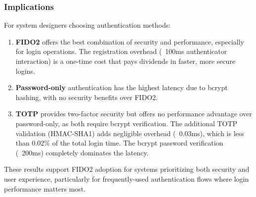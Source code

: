 \subsubsection{Implications}

For system designers choosing authentication methods:

\begin{enumerate}
    \item \textbf{FIDO2} offers the best combination of security and performance, especially for login operations. The registration overhead (~100ms authenticator interaction) is a one-time cost that pays dividends in faster, more secure logins.
    
    \item \textbf{Password-only} authentication has the highest latency due to bcrypt hashing, with no security benefits over FIDO2.
    
    \item \textbf{TOTP} provides two-factor security but offers no performance advantage over password-only, as both require bcrypt verification. The additional TOTP validation (HMAC-SHA1) adds negligible overhead (~0.03ms), which is less than 0.02\% of the total login time. The bcrypt password verification (~200ms) completely dominates the latency.
\end{enumerate}

These results support FIDO2 adoption for systems prioritizing both security and user experience, particularly for frequently-used authentication flows where login performance matters most.
